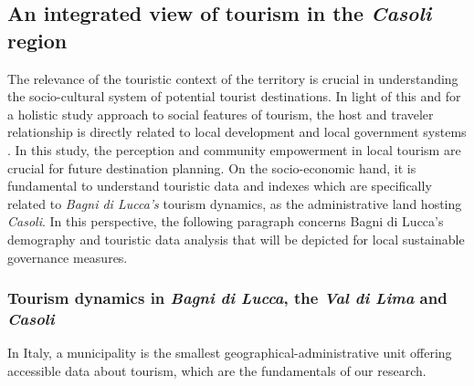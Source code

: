 \documentclass[sustainability,article,submit,pdftex,moreauthors]{Definitions/mdpi}
\begin{document}
\subsection{An integrated view of tourism in the \emph{Casoli} region}


The relevance of the touristic context of the territory is crucial in understanding the socio-cultural system of potential tourist destinations. In light of this and for a holistic study approach to social features of tourism, the host and traveler relationship is directly related to local development and local government systems \cite{amo21}. In this study, the perception and community empowerment in local tourism are crucial for future destination planning.
On the socio-economic hand, it is fundamental to understand touristic data and indexes which are specifically related to \textit{Bagni di Lucca's} tourism dynamics, as the administrative land hosting \textit{Casoli}. 
In this perspective, the following paragraph concerns {Bagni di Lucca's} demography and touristic data analysis that will be depicted for local sustainable governance measures.



\subsubsection{Tourism dynamics in \emph{Bagni di Lucca}, the \emph{Val di Lima} and \emph{Casoli}}

In Italy, a municipality is the smallest geographical-administrative unit offering accessible data about tourism, which are the fundamentals of our research.

\end{document}
